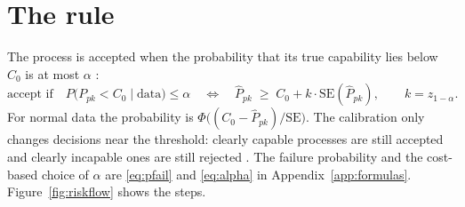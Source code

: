 \documentclass[a4paper,11pt,oneside,openany,parskip=half-,headings=standardclasses,toc=flat,numbers=noenddot]{scrbook}
\newcommand{\figref}[1]{Figure~\ref{#1}}
\newcommand{\Ppkhat}{\widehat{P}_{pk}}
\begin{document}
\section{The rule}

The process is accepted when the probability that its true capability lies below $C_0$ is at most
$\alpha$ \cite{jy-risk}:
\begin{equation}\label{eq:rule}
\text{accept if}\quad P\bigl(P_{pk} < C_0 \mid \text{data}\bigr) \le \alpha
\quad\Longleftrightarrow\quad
\Ppkhat \;\ge\; C_0 + k\cdot\mathrm{SE}(\Ppkhat), \qquad k = z_{1-\alpha}.
\end{equation}
For normal data the probability is $\Phi\bigl((C_0 - \Ppkhat)/\mathrm{SE}\bigr)$. The calibration only changes
decisions near the threshold: clearly capable processes are still accepted and clearly incapable ones are
still rejected \cite[Sec.~7]{jy-risk}. The failure probability and the cost-based choice of $\alpha$ are
\eqref{eq:pfail} and \eqref{eq:alpha} in Appendix~\ref{app:formulas}. \figref{fig:riskflow} shows the steps.
\end{document}
